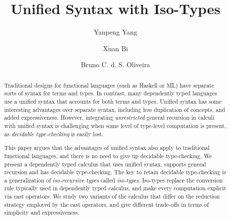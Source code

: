 \documentclass[runningheads,a4paper]{llncs}
\begin{document}
\mainmatter

\title{Unified Syntax with Iso-Types}

\author{Yanpeng Yang \and Xuan Bi \and Bruno C. d. S. Oliveira}



\maketitle

\begin{abstract}

  Traditional designs for functional languages (such as Haskell or ML)
  have separate sorts of syntax for terms and types. In contrast, many
  dependently typed languages use a unified syntax that accounts for
  both terms and types. Unified syntax has some interesting
  advantages over separate syntax, including less duplication of
  concepts, and added expressiveness. However, integrating
  \emph{unrestricted} general recursion in calculi with unified syntax
  is challenging when some level of type-level computation is present,
  as \emph{decidable type-checking} is easily lost.

  This paper argues that the advantages of unified syntax also
  apply to traditional functional languages, and there is no
  need to give up decidable type-checking.  We present a 
  dependently typed calculus that uses unified syntax, supports
  general recursion and has decidable type-checking.  The key to
  retain decidable type-checking is a generalization of
  \emph{iso-recursive types} called \emph{iso-types}. Iso-types
  replace the conversion rule typically used in dependently typed
  calculus, and make every computation explicit via cast operators. 
  We study two variants of the calculus that differ on the reduction 
  strategy employed by the cast operators, and give different
  trade-offs in terms of simplicity and expressiveness.


\begin{comment}
The obvious drawback of making each step
of type-level computation explicit is the loss of convenience to
perform type-level computation. However, the advantage is that the
calculus can easily support general recursion and generalized
iso-recursive types, while retaining the desirable properties of type
soundness and decidable type-checking. 



\end{comment}
\end{abstract}
\end{document}
